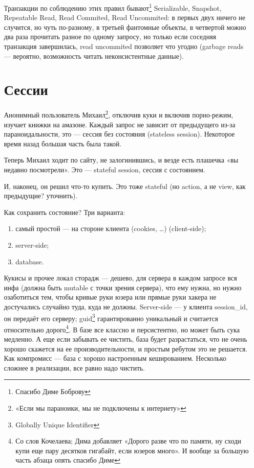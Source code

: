 \documentclass[11pt,a4paper]{article}
\begin{document}
Транзакции по соблюдению этих правил бывают\footnote{Спасибо Диме Боброву} Serializable, Snapshot, Repeatable Read, Read Commited, Read Uncommited: в первых двух ничего не случится, но чуть по-разному, в третьей фантомные объекты, в четвертой можно два раза прочитать разное по одному запросу, но только если соседняя транзакция завершилась, read uncommited позволяет что угодно (garbage reads — вероятно, возможность читать неконсистентные данные).

\section{Сессии}
Анонимный пользователь Михаил\footnote{«Если мы параноики, мы не подключены к интернету»}, отключив куки и включив порно-режим, изучает книжки на амазоне. Каждый запрос не зависит от предыдущего из-за параноидальности, это — сессия без состояния (stateless session). Некоторое время назад большая часть была такой.

Теперь Михаил ходит по сайту, не залогинившись, и везде есть плашечка «вы недавно посмотрели». Это — stateful session, сессия с состоянием.

И, наконец, он решил что-то купить. Это тоже stateful (но action, а не view, как предыдущие? уточнить).

Как сохранить состояние? Три варианта:
\begin{enumerate}
\item самый простой — на стороне клиента (cookies, …) (client-side);
\item server-side;
\item database.
\end{enumerate}

Кукисы и прочее локал сторадж — дешево, для сервера в каждом запросе вся инфа (должна быть mutable с точки зрения сервера), что ему нужна, но нужно озаботиться тем, чтобы кривые руки юзера или прямые руки хакера не достучались случайно туда, куда не должны. Server-side — у клиента session\_id, он передаёт его серверу; guid\footnote{Globally Unique Identifier} гарантированно уникальный и считается относительно дорого\footnote{Со слов Кочелаева; Дима добавляет «Дорого разве что по памяти, ну сходи купи еще пару десятков гигабайт, если юзеров много». И вообще за большую часть абзаца опять спасибо Диме}. В базе все классно и персистентно, но может быть сука медленно. А еще если забывать ее чистить, база будет разрастаться, что не очень хорошо скажется на ее производительности, и простым ребутом это не решается. Как компромисс — база с хорошо настроенным кешированием. Несколько сложнее в реализации, все равно надо чистить.
\end{document}
